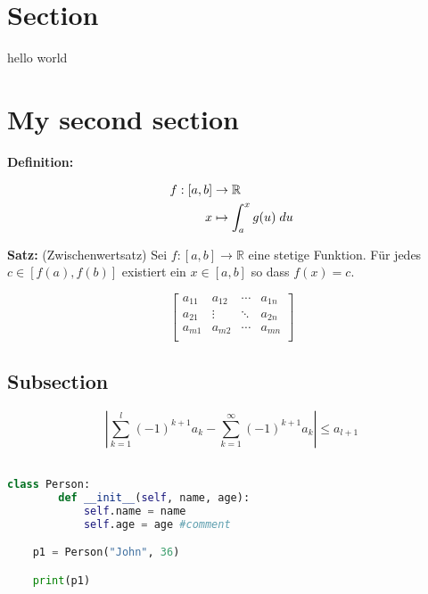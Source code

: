 \documentclass[11pt, a4paper]{article}
\begin{document}
	

\setformat
{}
	
\section*{Section}
\begin{fullbox}
	hello world
\end{fullbox}
\section*{My second section}
\textbf{Definition:} \lipsum[13]
	
\begin{fullbox}
 	\begin{align*}
 		f:[a,b] &\rightarrow \mathbb{R}\\
 		x &\mapsto \int_a^x g(u)\; du
 	\end{align*}
\end{fullbox}
	
\begin{outline}
	\textbf{Satz:} (Zwischenwertsatz) Sei $f:[a,b]\rightarrow \mathbb R$ eine stetige Funktion. Für jedes $c \in [f(a),f(b)]$ existiert ein $x \in [a,b]$ so dass $f(x) = c$.  
	 
	\[\begin{bmatrix} 
		a_{11} & a_{12} & \dotsi & a_{1n}\\
		a_{21} & \vdots & \ddots & a_{2n}\\
		a_{m1} & a_{m2} & \dotsi & a_{mn}\\ 
	\end{bmatrix}\]
\end{outline}
	 	
\subsection*{Subsection}

\[\left| \sum_{k=1}^l (-1)^{k+1} a_k -\sum_{k=1}^\infty (-1)^{k+1} a_k\right| \leq a_{l+1}\]\
	
	
\begin{lstlisting}[language=Python]
	class Person:
  		def __init__(self, name, age):
    		self.name = name
    		self.age = age #comment

	p1 = Person("John", 36)

	print(p1)\end{lstlisting}

	
\end{document}
